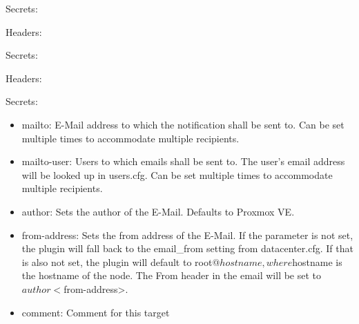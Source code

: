 Secrets:

Headers:

Secrets:

Headers:

Secrets:

\begin{itemize}[leftmargin=2cm]

	\item mailto: E-Mail address to which the notification shall be sent to. Can be set multiple times to accommodate multiple recipients.

	\item mailto-user: Users to which emails shall be sent to. The user’s email address will be looked up in users.cfg. Can be set multiple times to accommodate multiple recipients.

	\item author: Sets the author of the E-Mail. Defaults to Proxmox VE.

	\item from-address: Sets the from address of the E-Mail. If the parameter is not set, the plugin will fall back to the email_from setting from datacenter.cfg. If that is also not set, the plugin will default to root@$hostname, where $hostname is the hostname of the node. The From header in the email will be set to $author <$from-address>.

	\item comment: Comment for this target

\end{itemize}

